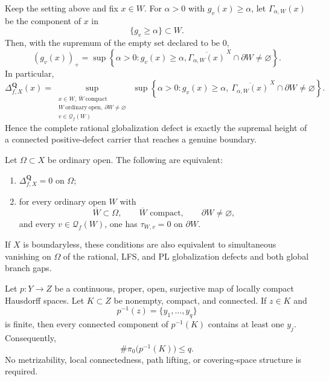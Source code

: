 \begin{corollary}
\label{cor:p031-rational-defect-end-height}
Keep the setting above and fix $x\in W$.  For $\alpha>0$ with
$g_v(x)\geq\alpha$, let $\Gamma_{\alpha,W}(x)$ be the component of $x$ in
\[
                       \{g_v\geq\alpha\}\subset W.
\]
Then, with the supremum of the empty set declared to be $0$,
\begin{equation}
\label{eq:p031-rational-defect-end-height}
 (g_v(x))_+
  =\sup\left\{\alpha>0:
      g_v(x)\geq\alpha,
      \overline{\Gamma_{\alpha,W}(x)}^{\,X}\cap\partial W
          \ne\varnothing\right\}.
\end{equation}
In particular,
\begin{equation}
\label{eq:p031-rational-defect-end-height-formula}
 \Delta^{\mathbf Q}_{f,X}(x)
  =
  \sup_{\substack{x\in W,\ \overline W\ \mathrm{compact}\\
                  W\ \mathrm{ordinary\ open},\ \partial W\ne\varnothing\\
                  v\in\mathcal Q_f(W)}}
  \ \sup\left\{\alpha>0:
      g_v(x)\geq\alpha,\
      \overline{\Gamma_{\alpha,W}(x)}^{\,X}\cap\partial W
          \ne\varnothing\right\}.
\end{equation}
Hence the complete rational globalization defect is exactly the supremal
height of a connected positive-defect carrier that reaches a genuine
boundary.
\end{corollary}

\begin{corollary}
\label{cor:p031-rational-defect-open-set-trace-characterization}
Let $\Omega\subset X$ be ordinary open.  The following are equivalent:
\begin{enumerate}[label=\textup{(\roman*)}]
\item
$\Delta^{\mathbf Q}_{f,X}=0$ on $\Omega$;
\item
for every ordinary open $W$ with
\[
 \overline W\subset\Omega,\qquad
 \overline W\text{ compact},\qquad
 \partial W\ne\varnothing,
\]
and every $v\in\mathcal Q_f(W)$, one has
$\tau_{W,v}=0$ on $\partial W$.
\end{enumerate}
If $X$ is boundaryless, these conditions are also equivalent to
simultaneous vanishing on $\Omega$ of the rational, LFS, and PL
globalization defects and both global branch gaps.
\end{corollary}

\begin{lemma}
\label{lem:p031-proper-open-compact-component-anchor}
Let $p:Y\to Z$ be a continuous, proper, open, surjective map of locally
compact Hausdorff spaces.  Let $K\subset Z$ be nonempty, compact, and
connected.  If $z\in K$ and
\[
                         p^{-1}(z)=\{y_1,\ldots,y_q\}
\]
is finite, then every connected component of $p^{-1}(K)$ contains at
least one $y_j$.  Consequently,
\begin{equation}
\label{eq:p031-proper-open-compact-component-anchor}
                  \#\pi_0\bigl(p^{-1}(K)\bigr)\leq q.
\end{equation}
No metrizability, local connectedness, path lifting, or covering-space
structure is required.
\end{lemma}

